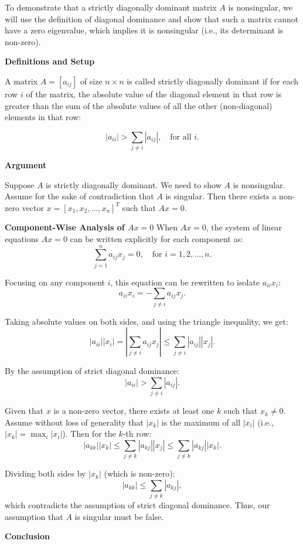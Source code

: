 \documentclass[8pt]{article}
\begin{document}
To demonstrate that a strictly diagonally dominant matrix \(A\) is nonsingular, we will use the definition of diagonal dominance and show that such a matrix cannot have a zero eigenvalue, which implies it is nonsingular (i.e., its determinant is non-zero).

\textbf{Definitions and Setup}

A matrix \(A = [a_{ij}]\) of size \(n \times n\) is called strictly diagonally dominant if for each row \(i\) of the matrix, the absolute value of the diagonal element in that row is greater than the sum of the absolute values of all the other (non-diagonal) elements in that row:

\[
|a_{ii}| > \sum_{j \neq i} |a_{ij}|, \quad \text{for all } i.
\]

\textbf{Argument}

Suppose \(A\) is strictly diagonally dominant. We need to show \(A\) is nonsingular. Assume for the sake of contradiction that \(A\) is singular. Then there exists a non-zero vector \(x = [x_1, x_2, \ldots, x_n]^T\) such that \(Ax = 0\).

\textbf{Component-Wise Analysis of \(Ax = 0\)}
When \(Ax = 0\), the system of linear equations \(Ax = 0\) can be written explicitly for each component as:
\[
\sum_{j=1}^n a_{ij} x_j = 0, \quad \text{for } i = 1, 2, \ldots, n.
\]

Focusing on any component \(i\), this equation can be rewritten to isolate \(a_{ii}x_i\):
\[
a_{ii}x_i = -\sum_{j \neq i} a_{ij} x_j.
\]

Taking absolute values on both sides, and using the triangle inequality, we get:
\[
|a_{ii}||x_i| = |\sum_{j \neq i} a_{ij} x_j| \leq \sum_{j \neq i} |a_{ij}||x_j|.
\]

By the assumption of strict diagonal dominance:
\[
|a_{ii}| > \sum_{j \neq i} |a_{ij}|.
\]

Given that \(x\) is a non-zero vector, there exists at least one \(k\) such that \(x_k \neq 0\). Assume without loss of generality that \(|x_k|\) is the maximum of all \(|x_i|\) (i.e., \(|x_k| = \max_i |x_i|\)). Then for the \(k\)-th row:
\[
|a_{kk}||x_k| \leq \sum_{j \neq k} |a_{kj}||x_j| \leq \sum_{j \neq k} |a_{kj}||x_k|.
\]

Dividing both sides by \(|x_k|\) (which is non-zero):
\[
|a_{kk}| \leq \sum_{j \neq k} |a_{kj}|,
\]
which contradicts the assumption of strict diagonal dominance. Thus, our assumption that \(A\) is singular must be false.

\textbf{Conclusion}
\end{document}
